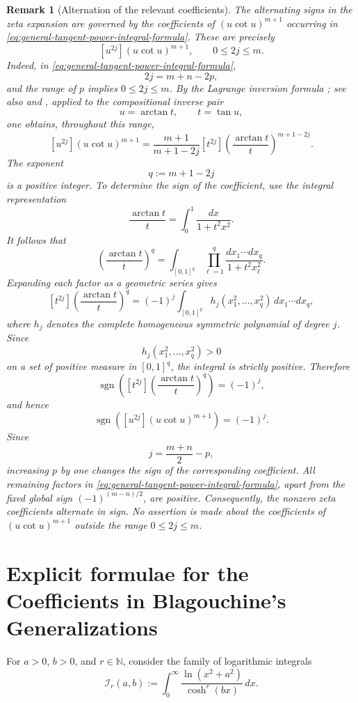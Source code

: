 \documentclass[11pt,twoside]{article}
\newtheorem{remark}[theorem]{Remark}
\numberwithin{equation}{section}
\begin{document}
\begin{remark}[Alternation of the relevant coefficients] The alternating signs in the zeta expansion are governed by the coefficients of \((u\cot u)^{m+1}\) occurring in \eqref{eq:general-tangent-power-integral-formula}. These are precisely \[ [u^{2j}](u\cot u)^{m+1}, \qquad 0\leq 2j\leq m. \] Indeed, in \eqref{eq:general-tangent-power-integral-formula}, \[ 2j=m+n-2p, \] and the range of \(p\) implies \(0\leq 2j\leq m\). By the Lagrange inversion formula \textnormal{\cite{SuryaWarnke2023}; see also\cite[Theorem~5.4.2]{Stanley2023} and \cite{Gessel2016,Comtet1974}}, applied to the compositional inverse pair \[ u=\arctan t, \qquad t=\tan u, \] one obtains, throughout this range, \[ [u^{2j}](u\cot u)^{m+1} = \frac{m+1}{m+1-2j} [t^{2j}] \left(\frac{\arctan t}{t}\right)^{m+1-2j}. \] The exponent \[ q:=m+1-2j \] is a positive integer. To determine the sign of the coefficient, use the integral representation \[ \frac{\arctan t}{t} = \int_0^1\frac{dx}{1+t^2x^2}. \] It follows that \[ \left(\frac{\arctan t}{t}\right)^q = \int_{[0,1]^q} \prod_{\ell=1}^q \frac{dx_1\cdots dx_q}{1+t^2x_\ell^2}. \] Expanding each factor as a geometric series gives \[ [t^{2j}] \left(\frac{\arctan t}{t}\right)^q = (-1)^j \int_{[0,1]^q} h_j(x_1^2,\ldots,x_q^2)\, dx_1\cdots dx_q, \] where \(h_j\) denotes the complete homogeneous symmetric polynomial of degree \(j\). Since \[ h_j(x_1^2,\ldots,x_q^2)>0 \] on a set of positive measure in \([0,1]^q\), the integral is strictly positive. Therefore \[ \operatorname{sgn} \left( [t^{2j}] \left(\frac{\arctan t}{t}\right)^q \right) = (-1)^j, \] and hence \[ \operatorname{sgn} \left( [u^{2j}](u\cot u)^{m+1} \right) = (-1)^j. \] Since \[ j=\frac{m+n}{2}-p, \] increasing \(p\) by one changes the sign of the corresponding coefficient. All remaining factors in \eqref{eq:general-tangent-power-integral-formula}, apart from the fixed global sign \((-1)^{(m-n)/2}\), are positive. Consequently, the nonzero zeta coefficients alternate in sign. No assertion is made about the coefficients of \((u\cot u)^{m+1}\) outside the range \(0\leq 2j\leq m\). \end{remark}

\section{Explicit formulae for the Coefficients in Blagouchine's
Generalizations}
\label{sec:blagouchine-coefficients}

For \(a>0\), \(b>0\), and \(r\in\mathbb{N}\), consider the family
of logarithmic integrals
\[
\mathcal{I}_{r}(a,b)
:=
\int_{0}^{\infty}
\frac{\ln(x^{2}+a^{2})}{\cosh^{r}(bx)}\,dx.
\]
\end{document}
